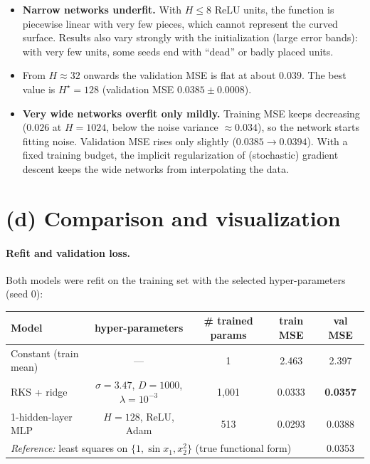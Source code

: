 \documentclass[11pt]{article}
\begin{document}
\begin{itemize}
\item \textbf{Narrow networks underfit.} With $H\le8$ ReLU units, the function is piecewise linear
with very few pieces, which cannot represent the curved surface. Results also vary strongly with
the initialization (large error bands): with very few units, some seeds end with ``dead'' or
badly placed units.
\item From $H\approx32$ onwards the validation MSE is flat at about $0.039$. The best value is
$H^\star=128$ (validation MSE $0.0385\pm0.0008$).
\item \textbf{Very wide networks overfit only mildly.} Training MSE keeps decreasing
($0.026$ at $H=1024$, below the noise variance $\approx0.034$), so the network starts fitting
noise. Validation MSE rises only slightly ($0.0385\to0.0394$). With a fixed training budget, the
implicit regularization of (stochastic) gradient descent keeps the wide networks from
interpolating the data.
\end{itemize}

\section*{(d) Comparison and visualization}

\paragraph{Refit and validation loss.} Both models were refit on the training set with the
selected hyper-parameters (seed 0):

\begin{table}[H]\centering
\begin{tabular}{lcccc}
\toprule
Model & hyper-parameters & \# trained params & train MSE & \textbf{val MSE}\\
\midrule
Constant (train mean)    & --- & 1 & 2.463 & 2.397\\
RKS + ridge              & $\sigma=3.47$, $D=1000$, $\lambda=10^{-3}$ & 1{,}001 & 0.0333 & \textbf{0.0357}\\
1-hidden-layer MLP       & $H=128$, ReLU, Adam                     & 513     & 0.0293 & 0.0388\\
\midrule
\multicolumn{4}{l}{\emph{Reference:} least squares on $\{1,\sin x_1,x_2^2\}$ (true functional form)} & 0.0353\\
\bottomrule
\end{tabular}
\end{table}
\end{document}
